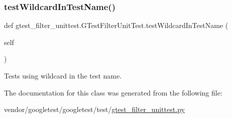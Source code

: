 \subsubsection{\texorpdfstring{test\+Wildcard\+In\+Test\+Name()}{testWildcardInTestName()}}
{\footnotesize\ttfamily def gtest\+\_\+filter\+\_\+unittest.\+G\+Test\+Filter\+Unit\+Test.\+test\+Wildcard\+In\+Test\+Name (\begin{DoxyParamCaption}\item[{}]{self }\end{DoxyParamCaption})}

\begin{DoxyVerb}Tests using wildcard in the test name.\end{DoxyVerb}
 

The documentation for this class was generated from the following file\+:\begin{DoxyCompactItemize}
\item 
vendor/googletest/googletest/test/\hyperlink{gtest__filter__unittest_8py}{gtest\+\_\+filter\+\_\+unittest.\+py}\end{DoxyCompactItemize}
